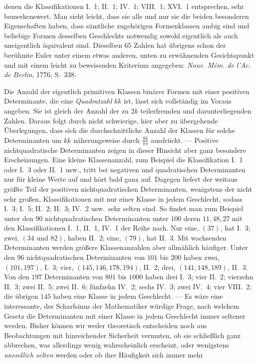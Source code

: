 denen die Klassifikationen I.~1; II.~1; IV.~1; VIII.~1; XVI.~1 entsprechen, sehr bemerkenswert. Man sieht leicht, dass sie alle und nur sie die beiden besonderen Eigenschaften haben, dass sämtliche zugehörigen Formenklassen ambig sind und beliebige Formen desselben Geschlechts notwendig sowohl eigentlich als auch uneigentlich äquivalent sind. Dieselben \(65\) Zahlen hat übrigens schon der berühmte Euler unter einem etwas anderen, unten zu erwähnenden Gesichtspunkt und mit einem leicht zu beweisenden Kriterium angegeben: \textit{Nouv. Mém. de l’Ac. de Berlin}, 1776, S.\ 338.

Die Anzahl der eigentlich primitiven Klassen binärer Formen mit einer positiven Determinante, die eine \textit{Quadratzahl} \(kk\) ist, lässt sich vollständig im Voraus angeben. Sie ist gleich der Anzahl der zu \(2k\) teilerfremden und darunterliegenden Zahlen. Daraus folgt durch nicht schwierige, hier aber zu übergehende Überlegungen, dass sich die durchschnittliche Anzahl der Klassen für solche Determinanten um \(kk\) näherungsweise durch \(\frac{8k}{\pi\pi}\) ausdrückt. — Positive nichtquadratische Determinanten zeigen in dieser Hinsicht aber ganz besondere Erscheinungen. Eine kleine Klassenanzahl, zum Beispiel die Klassifikation I.~1 oder I.~3 oder II.~1 usw., tritt bei negativen und quadratischen Determinanten nur für kleine Werte auf und hört bald ganz auf. Dagegen liefert der weitaus größte Teil der positiven nichtquadratischen Determinanten, wenigstens der nicht sehr großen, Klassifikationen mit nur einer Klasse in jedem Geschlecht, sodass I.~3; I.~5; II.~2; II.~3; IV.~2 usw.\ sehr selten sind. So findet man zum Beispiel unter den \(90\) nichtquadratischen Determinanten unter \(100\) deren \(11,48,27\) mit den Klassifikationen I.~1, II.~1, IV.~1 der Reihe nach. Nur eine, \((37)\), hat I.~3; zwei, \((34\text{ und }82)\), haben II.~2; eine, \((79)\), hat II.~3. Mit wachsenden Determinanten werden größere Klassenanzahlen aber allmählich häufiger. Unter den \(96\) nichtquadratischen Determinanten von \(101\) bis \(200\) haben zwei, \((101,197)\), I.~3; vier, \((145,146,178,194)\), II.~2; drei, \((141,148,189)\), II.~3. Von den \(197\) Determinanten von \(801\) bis \(1000\) haben drei I.~3; vier II.~2; vierzehn II.~3; zwei II.~5; zwei II.~6; fünfzehn IV.~2; sechs IV.~3; zwei IV.~4; vier VIII.~2; die übrigen \(145\) haben eine Klasse in jedem Geschlecht. — Es wäre eine interessante, des Scharfsinns der Mathematiker würdige Frage, nach welchem Gesetz die Determinanten mit einer Klasse in jedem Geschlecht immer seltener werden. Bisher können wir weder theoretisch entscheiden noch aus Beobachtungen mit hinreichender Sicherheit vermuten, ob sie schließlich ganz abbrechen, was allerdings wenig wahrscheinlich erscheint, oder wenigstens \textit{unendlich selten} werden oder ob ihre Häufigkeit sich immer mehr
